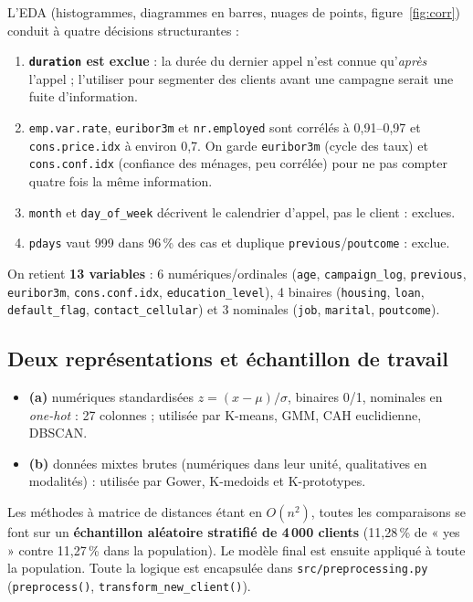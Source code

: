 \documentclass[11pt,a4paper]{article}
\begin{document}
L'EDA (histogrammes, diagrammes en barres, nuages de points, figure~\ref{fig:corr}) conduit à quatre décisions structurantes :
\begin{enumerate}
\item \textbf{\texttt{duration} est exclue} : la durée du dernier appel n'est connue qu'\emph{après} l'appel ; l'utiliser pour segmenter des clients avant une campagne serait une fuite d'information.
\item \texttt{emp.var.rate}, \texttt{euribor3m} et \texttt{nr.employed} sont corrélés à 0,91–0,97 et \texttt{cons.price.idx} à environ 0,7. On garde \texttt{euribor3m} (cycle des taux) et \texttt{cons.conf.idx} (confiance des ménages, peu corrélée) pour ne pas compter quatre fois la même information.
\item \texttt{month} et \texttt{day\_of\_week} décrivent le calendrier d'appel, pas le client : exclues.
\item \texttt{pdays} vaut 999 dans 96\,\% des cas et duplique \texttt{previous}/\texttt{poutcome} : exclue.
\end{enumerate}
On retient \textbf{13 variables} : 6 numériques/ordinales (\texttt{age}, \texttt{campaign\_log}, \texttt{previous}, \texttt{euribor3m}, \texttt{cons.conf.idx}, \texttt{education\_level}), 4 binaires (\texttt{housing}, \texttt{loan}, \texttt{default\_flag}, \texttt{contact\_cellular}) et 3 nominales (\texttt{job}, \texttt{marital}, \texttt{poutcome}).

\subsection{Deux représentations et échantillon de travail}
\begin{itemize}
\item \textbf{(a)} numériques standardisées $z=(x-\mu)/\sigma$, binaires 0/1, nominales en \emph{one-hot} : 27 colonnes ; utilisée par K-means, GMM, CAH euclidienne, DBSCAN.
\item \textbf{(b)} données mixtes brutes (numériques dans leur unité, qualitatives en modalités) : utilisée par Gower, K-medoids et K-prototypes.
\end{itemize}
Les méthodes à matrice de distances étant en $O(n^2)$, toutes les comparaisons se font sur un \textbf{échantillon aléatoire stratifié de 4\,000 clients} (11,28\,\% de « yes » contre 11,27\,\% dans la population). Le modèle final est ensuite appliqué à toute la population. Toute la logique est encapsulée dans \texttt{src/preprocessing.py} (\texttt{preprocess()}, \texttt{transform\_new\_client()}).
\end{document}
